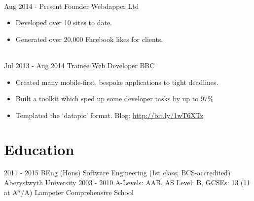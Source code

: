 \documentclass[letterpaper]{twentysecondcv} %
\begin{document}
\begin{twenty}
{        }
     \\
     \twentyitem
   		{Aug 2014 -}
		{Present}
        {Founder}
        {Webdapper Ltd}
        {}
        {
        \begin{itemize}
        \item Developed over 10 sites to date.
        \item Generated over 20,000 Facebook likes for clients.
    \end{itemize}
    	}
    \\
    \twentyitem
   		{Jul 2013 -}
		{Aug 2014}
        {Trainee Web Developer}
        {BBC}
        {}
        {
        {\begin{itemize}
        \item Created many mobile-first, bespoke applications to tight deadlines.
        \item Built a toolkit which sped up some developer tasks by up to 97\%
        \item Templated the ‘datapic’ format. Blog: \url{http://bit.ly/1wT6XTz}
    \end{itemize}}
        }

\end{twenty}

\section{Education}

\begin{twenty} %
	\twentyitem
    	{2011 - 2015}
        {}
        {BEng (Hons) Software Engineering \textnormal{(1st class; BCS-accredited)}}
        {}
        {Aberystwyth University}
        {}
	\twentyitem
    	{2003 - 2010}
		{}
        {A-Levels: \textnormal{AAB}, AS Level: \textnormal{B}, GCSEs: \textnormal{13 (11 at A*/A)}
        }
        {}
        {Lampeter Comprehensive School}
        {}
\end{twenty}
\end{document}
